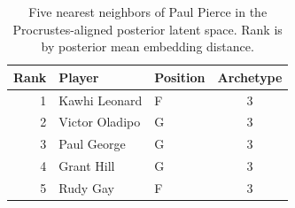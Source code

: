 \begin{table}[htbp]
  \centering\small
  \begin{tabular}{rllc}
    \toprule
    Rank & Player & Position & Archetype \\
    \midrule
    1 & Kawhi Leonard & F & 3 \\
    2 & Victor Oladipo & G & 3 \\
    3 & Paul George & G & 3 \\
    4 & Grant Hill & G & 3 \\
    5 & Rudy Gay & F & 3 \\
    \bottomrule
  \end{tabular}
  \caption{Five nearest neighbors of Paul Pierce in the Procrustes-aligned posterior latent space. Rank is by posterior mean embedding distance.}
  \label{tab:Paul_Pierce_neighbors}
\end{table}

